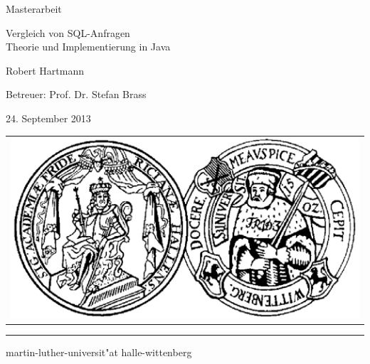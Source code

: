 \pagestyle{empty}

\begin{center}

{\Large\sc Masterarbeit}

\vspace{1.25cm}

{\fontsize{22}{22}\selectfont Vergleich von SQL-Anfragen\\Theorie und Implementierung in Java}

\vspace{1.25cm}

{\Large\sc

Robert Hartmann

\vspace{.15cm}

Betreuer: Prof. Dr. Stefan Brass

\vspace{.15cm}

24. September 2013

}

\vspace{10.5cm}

\begin{tabular}{c}
	\includegraphics[height=15ex]{Bilder/siegel}
\end{tabular}

\vspace{0.5cm}

\rule{.7\textwidth}{.40pt}

\vspace{.2cm}

{\large\sc

martin-luther-universit"at halle-wittenberg

}

\end{center}

\cleardoublepage

